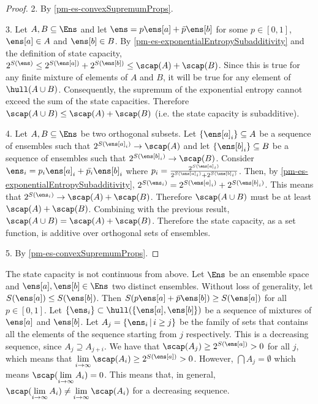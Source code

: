 \begin{mathSection}
\begin{proof}
	2. By \ref{pm-es-convexSupremumProps}.
	
	3. Let $A, B \subseteq \Ens$ and let $\ens = p \ens[a] + \bar{p} \ens[b]$ for some $p \in [0,1]$, $\ens[a] \in A$ and $\ens[b] \in B$. By \ref{pm-es-exponentialEntropySubadditivity} and the definition of state capacity, $2^{S(\ens)} \leq 2^{S(\ens[a])} + 2^{S(\ens[b])} \leq \scap(A) + \scap(B)$. Since this is true for any finite mixture of elements of $A$ and $B$, it will be true for any element of $\hull(A \cup B)$. Consequently, the supremum of the exponential entropy cannot exceed the sum of the state capacities. Therefore $\scap(A \cup B) \leq \scap(A) + \scap(B)$ (i.e. the state capacity is subadditive).
	
	4. Let $A, B \subseteq \Ens$ be two orthogonal subsets. Let $\{\ens[a]_i\} \subseteq A$ be a sequence of ensembles such that $2^{S(\ens[a]_i)} \to \scap(A)$ and let $\{\ens[b]_i\} \subseteq B$ be a sequence of ensembles such that $2^{S(\ens[b]_i)} \to \scap(B)$. Consider $\ens_i = p_i \ens[a]_i + \bar{p_i} \ens[b]_i$ where $p_i = \frac{2^{S(\ens[a]_i)}}{2^{S(\ens[a]_i)} + 2^{S(\ens[b]_i)}}$. Then, by \ref{pm-es-exponentialEntropySubadditivity}, $2^{S(\ens_i)} = 2^{S(\ens[a]_i)} + 2^{S(\ens[b]_i)}$. This means that $2^{S(\ens_i)} \to \scap(A) + \scap(B)$. Therefore $\scap(A \cup B)$ must be at least $\scap(A) + \scap(B)$. Combining with the previous result, $\scap(A \cup B) = \scap(A) + \scap(B)$. Therefore the state capacity, as a set function, is additive over orthogonal sets of ensembles.

	5. By \ref{pm-es-convexSupremumProps}.
\end{proof}

\begin{remark}
	The state capacity is not continuous from above. Let $\Ens$ be an ensemble space and $\ens[a], \ens[b] \in \Ens$ two distinct ensembles. Without loss of generality, let $S(\ens[a]) \leq S(\ens[b])$. Then $S(p \ens[a] + \bar{p} \ens[b]) \geq S(\ens[a])$ for all $p \in [0,1]$. Let $\{ \ens_i \} \subset \hull(\{\ens[a], \ens[b]\})$ be a sequence of mixtures of $\ens[a]$ and $\ens[b]$. Let $A_j = \{ \ens_i \, | \, i \geq j\}$ be the family of sets that contains all the elements of the sequence starting from $j$ respectively. This is a decreasing sequence, since $A_j \supseteq A_{j+i}$. We have that $\scap(A_j) \geq 2^{S(\ens[a])} > 0$ for all $j$, which means that $\lim\limits_{i \to \infty} \scap(A_i) \geq 2^{S(\ens[a])} > 0$. However, $\bigcap A_j = \emptyset$ which means $\scap(\lim\limits_{i \to \infty} A_i) = 0$. This means that, in general, $\scap(\lim\limits_{i \to \infty} A_i) \neq \lim\limits_{i \to \infty} \scap(A_i)$ for a decreasing sequence.
\end{remark}

\end{mathSection}

